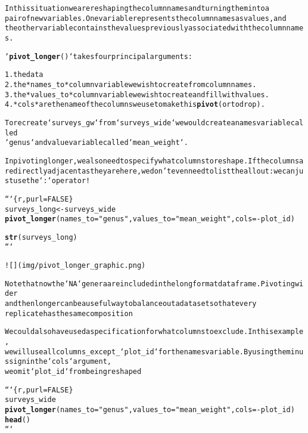 \documentclass{article}\usepackage[]{graphicx}\usepackage[]{xcolor}
\makeatletter
\newcommand{\hlstr}[1]{\textcolor[rgb]{0.192,0.494,0.8}{#1}}%
\newcommand{\hlkwd}[1]{\textcolor[rgb]{0.737,0.353,0.396}{\textbf{#1}}}%
\newenvironment{kframe}{%
 \def\at@end@of@kframe{}%
 \ifinner\ifhmode%
  \def\at@end@of@kframe{\end{minipage}}%
  \begin{minipage}{\columnwidth}%
 \fi\fi%
 \def\FrameCommand##1{\hskip\@totalleftmargin \hskip-\fboxsep
 \colorbox{shadecolor}{##1}\hskip-\fboxsep
     \hskip-\linewidth \hskip-\@totalleftmargin \hskip\columnwidth}%
 \MakeFramed {\advance\hsize-\width
   \@totalleftmargin\z@ \linewidth\hsize
   \@setminipage}}%
 {\par\unskip\endMakeFramed%
 \at@end@of@kframe}
\newenvironment{knitrout}{}{} %
\makeatother
\begin{document}
\begin{knitrout}
\begin{kframe}
\begin{alltt}
In this situation we are reshaping the column names and turning them into a
pair of new variables. One variable represents the column names as values, and
the other variable contains the values previously associated with the column names.

`\hlkwd{pivot_longer}()` takes four principal arguments:

1. the data
2. the *names_to* column variable we wish to create from column names.
3. the *values_to* column variable we wish to create and fill with values.
4. *cols* are the name of the columns we use to make this \hlkwd{pivot} (or to drop).

To recreate `surveys_gw` from `surveys_wide` we would create a names variable called
`genus` and value variable called `mean_weight`.

In pivoting longer, we also need to specify what columns to reshape. If the columns are directly adjacent as they are here, we don't even need to list the all out: we can just use the `:` operator!

```\{r, purl=FALSE\}
surveys_long <- surveys_wide %>%
  \hlkwd{pivot_longer}(names_to = \hlstr{"genus"}, values_to = \hlstr{"mean_weight"}, cols = -plot_id)

\hlkwd{str}(surveys_long)
```

![](img/pivot_longer_graphic.png)

Note that now the `NA` genera are included in the long format data frame. Pivoting wider 
and then longer can be a useful way to balance out a dataset so that every 
replicate has the same composition

We could also have used a specification for what columns to exclude. In this example,
we will use all columns _except_ `plot_id` for the names variable. By using the minus sign in the `cols` argument,
we omit `plot_id` from being reshaped

```\{r, purl=FALSE\}
surveys_wide %>%
  \hlkwd{pivot_longer}(names_to = \hlstr{"genus"}, values_to = \hlstr{"mean_weight"}, cols = -plot_id) %>%
  \hlkwd{head}()
```


\end{alltt}
\end{kframe}
\end{knitrout}
\end{document}
